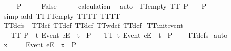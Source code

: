 \ \isamarkupfalse%
\ {\isachardoublequoteopen}{\isacharbrackleft}{\isacharbrackright}\ {\isasymnotin}\ P{\isachardoublequoteclose}\isanewline
\ \ \isamarkupfalse%
\ \isamarkupfalse%
\ {\isachardoublequoteopen}False{\isachardoublequoteclose}\isanewline
\ \ \ \ \isamarkupfalse%
\ calculation\ \isamarkupfalse%
\ auto\isanewline
{}\isamarkupfalse%
%
\endisatagproof
{\isafoldproof}%
%
\isadelimproof
\isanewline
%
\endisadelimproof
\isanewline
{}\isamarkupfalse%
\ TT{\isacharunderscore}empty{\isacharcolon}\ {\isachardoublequoteopen}TT\ P\ {\isasymLongrightarrow}\ {\isacharbrackleft}{\isacharbrackright}\ {\isasymin}\ P{\isachardoublequoteclose}\isanewline
%
\isadelimproof
\ \ %
\endisadelimproof
%
\isatagproof
{}\isamarkupfalse%
\ {\isacharparenleft}simp\ add{\isacharcolon}\ TT{}{\isacharunderscore}TT{}{\isacharunderscore}empty\ TT{\isacharunderscore}TT{}\ TT{\isacharunderscore}TT{}{\isacharparenright}%
\endisatagproof
{\isafoldproof}%
%
\isadelimproof
\isanewline
%
\endisadelimproof
\isanewline
{}\isamarkupfalse%
\ TT{\isacharunderscore}defs\ {\isacharequal}\ TT{\isacharunderscore}def\ TT{}{\isacharunderscore}def\ TT{}{\isacharunderscore}def\ TT{}w{\isacharunderscore}def\ TT{}{\isacharunderscore}def\isanewline
\isanewline
{}\isamarkupfalse%
\ TT{\isacharunderscore}init{\isacharunderscore}event{\isacharcolon}\isanewline
\ \ \ {\isachardoublequoteopen}TT\ P{\isachardoublequoteclose}\ {\isachardoublequoteopen}{\isasymexists}\ t{\isachardot}\ {\isacharbrackleft}Event\ e{\isacharbrackright}\isactrlsub E\ {\isacharhash}\ t\ {\isasymin}\ P{\isachardoublequoteclose}\isanewline
\ \ \ {\isachardoublequoteopen}TT\ {\isacharbraceleft}t{\isachardot}\ {\isacharbrackleft}Event\ e{\isacharbrackright}\isactrlsub E\ {\isacharhash}\ t\ {\isasymin}\ P{\isacharbraceright}{\isachardoublequoteclose}\isanewline
%
\isadelimproof
\ \ %
\endisadelimproof
%
\isatagproof
{}\isamarkupfalse%
\ TT{\isacharunderscore}defs\isanewline
{}\isamarkupfalse%
\ auto\isanewline
\ \ \isamarkupfalse%
\ x\ \isanewline
\ \ \isamarkupfalse%
\ {\isachardoublequoteopen}{\isacharbrackleft}Event\ e{\isacharbrackright}\isactrlsub E\ {\isacharhash}\ x\ {\isasymin}\ P{\isachardoublequoteclose}\isanewline
\ \ \isamarkupfalse%
\ \isamarkupfalse%
